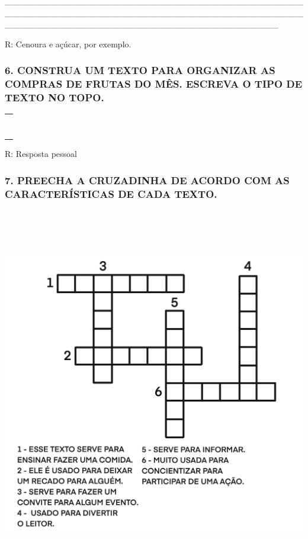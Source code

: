 \_\_\_\_\_\_\_\_\_\_\_\_\_\_\_\_\_\_\_\_\_\_\_\_\_\_\_\_\_\_\_\_\_\_\_\_\_\_\_\_\_\_\_\_\_\_\_\_\_\_\_\_\_\_\_\_\_\_\_\_\_\_\_\_\_\_\_\_\_\_\_\_\_\_\_\_\_\_\_\_\_\_\_\_\_\_\_\_\_\_\_\_\_\_\_\_\_\_\_\_\_\_\_\_\_\_\_\_\_\_\_\_\_\_\_\_\_\_\_\_\_\_\_\_\_\_\_\_\_\_\_\_\_\_\_\_\_\_\_\_

R: Cenoura e açúcar, por exemplo.

\subsubsection{6. CONSTRUA UM TEXTO PARA ORGANIZAR AS COMPRAS
DE FRUTAS DO MÊS. ESCREVA O TIPO DE TEXTO NO TOPO.
}\label{construa-um-texto-que-serve-para-organizar-as-compras-de-frutas-do-muxeas.}

\begin{longtable}[]{@{}l@{}}
\toprule
\tabularnewline
\tabularnewline
\tabularnewline
\tabularnewline
\tabularnewline
\tabularnewline
\tabularnewline
\tabularnewline
\bottomrule
\end{longtable}

R: Resposta pessoal

\subsubsection{7. PREECHA A CRUZADINHA DE ACORDO COM AS
CARACTERÍSTICAS DE CADA
TEXTO.}\label{preecha-a-cruzadinha-com-de-acordo-com-a-caracteristica-de-cada-texto.}

\includegraphics[width=5.80417in,height=6.50556in]{media/image155.png}

